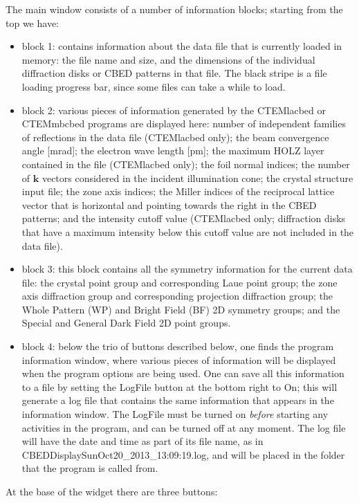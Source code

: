 \documentclass[DIV=calc, paper=letter, fontsize=11pt]{scrartcl}	 %
\begin{document}
The main window consists of a number of information blocks; starting from the top we have:
\begin{itemize}
	\item block 1: contains information about the data file that is currently loaded in memory: the file name and size, and the dimensions of the 
	individual diffraction disks or CBED patterns in that file.  The black stripe is a file loading progress bar, since some files can take a while to load.
	\item block 2: various pieces of information generated by the \textsf{CTEMlacbed} or \textsf{CTEMmbcbed} programs are displayed here: number 
	of independent families of reflections in the data file (\textsf{CTEMlacbed} only); the beam convergence angle [mrad]; the electron wave length [pm];
	the maximum HOLZ layer contained in the file (\textsf{CTEMlacbed} only); the foil normal indices; the number of $\mathbf{k}$ vectors considered 
	in the incident illumination cone; the crystal structure input file; the zone axis indices; the Miller indices of the reciprocal lattice vector that is horizontal
	and pointing towards the right in the CBED patterns; and the intensity cutoff value (\textsf{CTEMlacbed} only; diffraction disks that have a maximum
	intensity below this cutoff value are not included in the data file).
	\item block 3: this block contains all the symmetry information for the current data file: the crystal point group and corresponding Laue point group;
	the zone axis diffraction group and corresponding projection diffraction group; the Whole Pattern (WP) and Bright Field (BF) 2D symmetry groups;
	and the Special and General Dark Field 2D point groups.
	\item block 4: below the trio of buttons described below, one finds the program information window, where various pieces of information will be 
	displayed when the program options are being used.  One can save all this information to a file by setting the LogFile button at the bottom right
	to \textsf{On}; this will generate a log file that contains the same information that appears in the information window.  The LogFile must be 
	turned on \textit{before} starting any activities in the program, and can be turned off at any moment.  The log file will have the 
	date and time as part of its file name, as in \textsf{CBEDDisplaySunOct20\_2013\_13:09:19.log}, and will be placed in the folder that the program is called from.
\end{itemize}
At the base of the widget there are three buttons:
\end{document}
